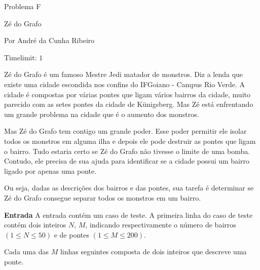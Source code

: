 \begin{center}
Problema F

Zé do Grafo

{\tiny Por André da Cunha Ribeiro}

Timelimit: $1$	
\end{center}			

Zé do Grafo é um famoso Mestre Jedi matador de monstros. Diz a lenda que existe uma cidade escondida nos confins do IFGoiano - Campus Rio Verde. A cidade é compostas por várias pontes que ligam vários bairros da cidade, muito parecido com as setes pontes da cidade de Künigsberg. Mas Zé está enfrentando um grande problema na cidade que é o aumento dos monstros.

Mas Zé do Grafo tem contigo um grande poder. Esse poder permitir ele isolar todos os monstros em alguma ilha e depois ele pode destruir as pontes que ligam o bairro. Tudo estaria certo se Zé do Grafo não tivesse o limite de uma bomba. Contudo, ele precisa de sua ajuda para identificar se a cidade possui um bairro ligado por apenas uma ponte.

Ou seja, dadas as descrições dos bairros e das pontes, sua tarefa é determinar se Zé do Grafo consegue separar todos os monstros em um bairro.

\vspace{0.3cm}
\textbf{Entrada}
A entrada contém um caso de teste. A primeira linha do caso de teste contém dois inteiros $N$, $M$, indicando respectivamente o número de bairros $(1 \leq N \leq 50)$ e de pontes $(1 \leq M \leq 200)$.

Cada uma das $M$ linhas seguintes composta de dois inteiros que descreve uma ponte.

